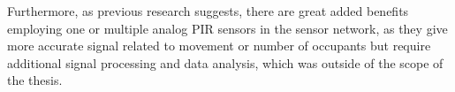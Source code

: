 Furthermore, as previous research suggests, there are great added benefits employing one or multiple analog PIR sensors in the sensor network, as they give more accurate signal related to movement or number of occupants but require additional signal processing and data analysis, which was outside of the scope of the thesis.




